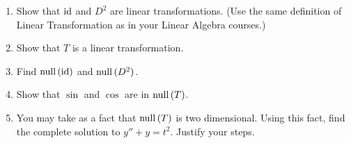 \begin{enumerate}
	\begin{enumerate}
		\item Show that $\operatorname{id}$ and $D^2$ are linear transformations. (Use the same definition of Linear Transformation as in your Linear Algebra courses.)
		\item Show that $T$ is a linear transformation.
		\item Find $\mathrm{null}\,(\operatorname{id})$ and $\mathrm{null}\,(D^2)$.
		\item Show that $\sin$ and $\cos$ are in $\mathrm{null}\,(T)$.
		\item You may take as a fact that $\mathrm{null}\,(T)$ is two dimensional. Using this fact, find the complete solution to $y''+y=t^2$. Justify your steps.
	\end{enumerate}

\end{enumerate}

















